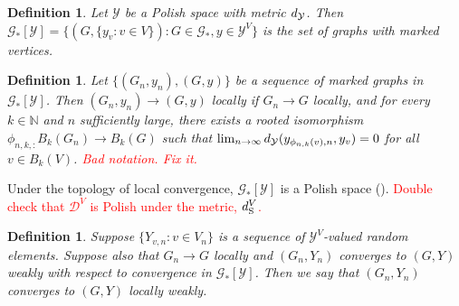 \documentclass[12pt]{article}
\newcommand{\mb}{\mathbb}
\newcommand{\mc}{\mathcal}
\newcommand{\ra}{\rightarrow}
\newcommand{\te}{\text}
\newcommand{\tr}{\textcolor{red}}
\newcommand{\cad}{\mc{D}}							%
\newcommand{\stmet}[1]{
\ifstrempty{#1}{
	d_{\te{S}}}{
	d_{\te{S},#1}}}									%
\newcommand{\xg}{y}									%
\newcommand{\met}[2]{
\ifstrempty{#2}{
	d_{#1}}{
	d_{#1,#2}}}										%
\newcommand{\vind}[1]{_{#1}}						%
\newcommand{\vpara}[1]{^{#1}}						%
\newcommand{\Gs}{\mc{G}_\ast}						%
\newcommand{\trnc}[1]{B_{#1}}						%
\newcommand{\spce}{\mc{Y}}							%
\renewcommand{\sp}[1]{[#1]}							%
\newcommand{\dit}[2]{_{#1,#2}}						%
\newcommand{\vindit}[2]{_{#1,#2}}					%
\newcommand{\Xg}{Y}									%
\renewcommand{\it}[1]{_{#1}}						%
\newtheorem{defn}[thms]{Definition}
\begin{document}
\begin{defn}
Let \(\spce\) be a Polish space with metric \(\met{\spce}{}\). Then \(\Gs\sp{\spce} = \{(G,\{\xg\vind{v}:v \in V\}): G \in \Gs, \xg\in \spce^V\}\) is the set of graphs with marked vertices.
\label{lwc::marked}
\end{defn}

\begin{defn}
Let \(\{(G\it{n},\xg\it{n}),(G,\xg)\}\) be a sequence of marked graphs in \(\Gs\sp{\spce}\). Then \((G\it{n},\xg\it{n}) \ra (G,\xg)\) locally if \(G\it{n} \ra G\) locally, and for every \(k \in \mb{N}\) and \(n\) sufficiently large, there exists a rooted isomorphism \(\phi\dit{n,k}:\trnc{k}(G\it{n}) \ra \trnc{k}(G)\) such that \(\lim_{n\ra\infty} \met{\spce}{}(\xg\vindit{\phi\dit{n}{k}(v)}{n},\xg\vind{v}) = 0\) for all \(v \in \trnc{k}(V)\). \tr{Bad notation. Fix it.}
\label{lwc::mlc}
\end{defn}

Under the topology of local convergence, \(\Gs\sp{\spce}\) is a Polish space (\cite[Lemmas A.2, A.3, and A.5]{LacRamWu19}). \tr{Double check that \(\cad^V\) is Polish under the metric, \(\stmet{}\vpara{V}\).}

\begin{defn}
Suppose \(\{\Xg\vindit{v}{n}:v \in V\it{n}\}\) is a sequence of \(\spce^V\)-valued random elements. Suppose also that \(G\it{n} \ra G\) locally and \((G\it{n},\Xg\it{n})\) converges to \((G,\Xg)\) weakly with respect to convergence in \(\Gs\sp{\spce}\). Then we say that \((G\it{n},\Xg\it{n})\) converges to \((G,\Xg)\) locally weakly.
\label{lwc::lwc}
\end{defn} 
\end{document}
